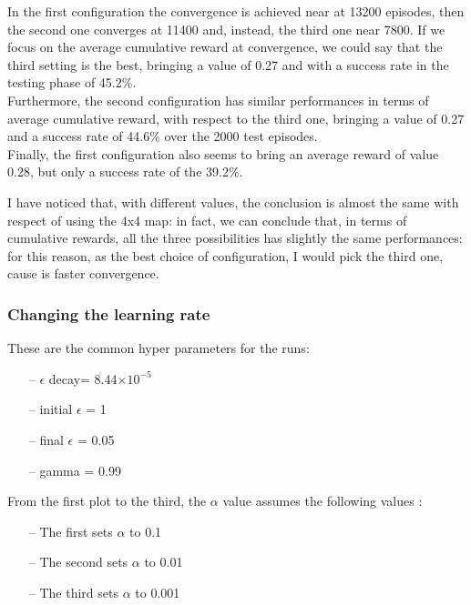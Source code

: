 \documentclass{article}
\begin{document}
\clearpage

In the first configuration the convergence is achieved near at 13200 episodes, then the second one converges at 11400 and, instead, the third one near 7800.
If we focus on the average cumulative reward at convergence, we could say that the third setting is the best, bringing a value of 0.27 and with a success rate in the testing phase of 45.2\%.
\\
Furthermore, the second configuration has similar performances in terms of average cumulative reward, with respect to the third one, bringing a value of 0.27 and a success rate of 44.6\% over the 2000 test episodes.
\\
Finally, the first configuration also seems to bring an average reward of value 0.28, but only a success rate of the 39.2\%.

I have noticed that, with different values, the conclusion is almost the same with respect of using the 4x4 map: in fact, we can conclude that, in terms of cumulative rewards, all the three possibilities has slightly the same performances:
\\
for this reason, as the best choice of configuration, I would pick the third one, cause is faster convergence.




\subsubsection{Changing the learning rate}


These are the common hyper parameters for the runs:
\begin{itemize}
\item[--] $\epsilon$ decay= 8.44$\times10^{-5}$
\item[--] initial $\epsilon$ = 1
\item[--] final $\epsilon$ = 0.05
\item[--] gamma = 0.99
\end{itemize}

From the first plot to the third, the $\alpha$ value assumes the following values :
\begin{itemize}
\item[--] The first sets $\alpha$ to 0.1
\item[--] The second sets $\alpha$ to 0.01
\item[--] The third sets $\alpha$ to 0.001
\end{itemize}

\clearpage
\end{document}

